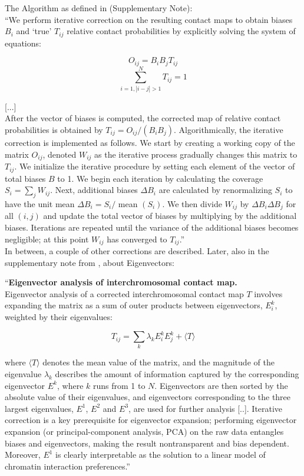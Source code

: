 The Algorithm as defined in \cite{imakaev2012iterative} (Supplementary Note): \\
``We perform iterative correction on the resulting contact maps to obtain
biases $B_i$ and `true' $T_{ij}$ relative contact probabilities by explicitly
solving the system of equations:

$$ O_{ij} = B_i B_j T_{ij} $$
$$ \sum^N_{i=1, |i-j|>1} T_{ij} = 1$$

[...] \\
After the vector of biases is computed, the corrected map of relative
contact probabilities is obtained by $T_{ij} = O_{ij} / (B_i B_j)$.
Algorithmically, the iterative correction is implemented as follows. We start
by creating a working copy of the matrix $O_{ij}$, denoted $W_{ij}$ as the
iterative process gradually changes this matrix to $T_{ij}$. We initialize the
iterative procedure by setting each element of the vector of total biases $B$
to 1. We begin each iteration by calculating the coverage $S_i = \sum_j
W_{ij}$. Next, additional biases $\Delta B_i$ are calculated by renormalizing
$S_i$ to have the unit mean $\Delta B_i = S_i /$ mean $(S_i)$. We then divide
$W_{ij}$ by $\Delta B_i \Delta B_j$ for all $(i, j)$ and update the total
vector of biases by multiplying by the additional biases. Iterations are
repeated until the variance of the additional biases becomes negligible; at
this point $W_{ij}$ has converged to $T_{ij}$.'' \\

In between, a couple of other corrections are described. Later, also in the
supplementary note from \cite{imakaev2012iterative}, about Eigenvectors:

``\textbf{Eigenvector analysis of interchromosomal contact map.} \\
Eigenvector analysis of a corrected interchromosomal contact map $T$ involves
expanding the matrix as a sum of outer products between eigenvectors, $E^k_i$,
weighted by their eigenvalues:

$$ T_{ij} = \sum_k \lambda_k E^k_i E^k_j + \langle T \rangle$$

where $\langle T \rangle$ denotes the mean value of the matrix, and the
magnitude of the eigenvalue $\lambda_k$ describes the amount of information
captured by the corresponding eigenvector $E^k$, where $k$ runs from 1 to $N$.
Eigenvectors are then sorted by the absolute value of their eigenvalues, and
eigenvectors corresponding to the three largest eigenvalues, $E^1$, $E^2$ and
$E^3$, are used for further analysis [..]. Iterative correction is a key
prerequisite for eigenvector expansion; performing eigenvector expansion (or
principal-component analysis, PCA) on the raw data entangles biases and
eigenvectors, making the result nontransparent and bias dependent. Moreover,
$E^1$ is clearly interpretable as the solution to a linear model of chromatin
interaction preferences.''





